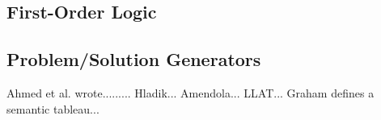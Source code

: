 \documentclass[ms]{uncgdissertationexp2}
\theoremstyle{plain}
\theoremstyle{definition}
\theoremstyle{remark}
\begin{document}
\subsection{First-Order Logic}
\subsection{Problem/Solution Generators}
Ahmed et al. wrote.........
Hladik...
Amendola...
LLAT... Graham defines a semantic tableau...
\end{document}
